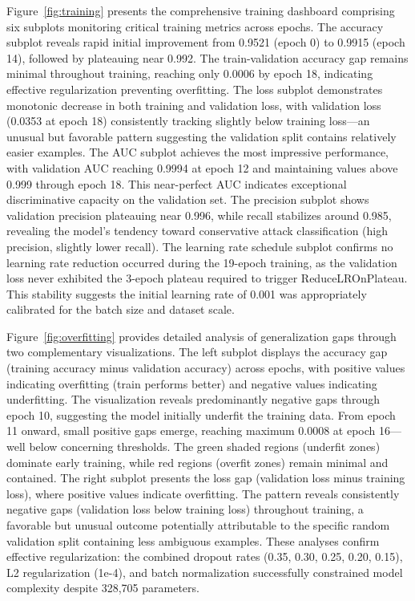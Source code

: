 \documentclass[12pt,a4paper]{report}
\begin{document}
Figure~\ref{fig:training} presents the comprehensive training dashboard comprising six subplots monitoring critical training metrics across epochs. The accuracy subplot reveals rapid initial improvement from 0.9521 (epoch 0) to 0.9915 (epoch 14), followed by plateauing near 0.992. The train-validation accuracy gap remains minimal throughout training, reaching only 0.0006 by epoch 18, indicating effective regularization preventing overfitting. The loss subplot demonstrates monotonic decrease in both training and validation loss, with validation loss (0.0353 at epoch 18) consistently tracking slightly below training loss---an unusual but favorable pattern suggesting the validation split contains relatively easier examples. The AUC subplot achieves the most impressive performance, with validation AUC reaching 0.9994 at epoch 12 and maintaining values above 0.999 through epoch 18. This near-perfect AUC indicates exceptional discriminative capacity on the validation set. The precision subplot shows validation precision plateauing near 0.996, while recall stabilizes around 0.985, revealing the model's tendency toward conservative attack classification (high precision, slightly lower recall). The learning rate schedule subplot confirms no learning rate reduction occurred during the 19-epoch training, as the validation loss never exhibited the 3-epoch plateau required to trigger ReduceLROnPlateau. This stability suggests the initial learning rate of 0.001 was appropriately calibrated for the batch size and dataset scale.

Figure~\ref{fig:overfitting} provides detailed analysis of generalization gaps through two complementary visualizations. The left subplot displays the accuracy gap (training accuracy minus validation accuracy) across epochs, with positive values indicating overfitting (train performs better) and negative values indicating underfitting. The visualization reveals predominantly negative gaps through epoch 10, suggesting the model initially underfit the training data. From epoch 11 onward, small positive gaps emerge, reaching maximum 0.0008 at epoch 16---well below concerning thresholds. The green shaded regions (underfit zones) dominate early training, while red regions (overfit zones) remain minimal and contained. The right subplot presents the loss gap (validation loss minus training loss), where positive values indicate overfitting. The pattern reveals consistently negative gaps (validation loss below training loss) throughout training, a favorable but unusual outcome potentially attributable to the specific random validation split containing less ambiguous examples. These analyses confirm effective regularization: the combined dropout rates (0.35, 0.30, 0.25, 0.20, 0.15), L2 regularization (1e-4), and batch normalization successfully constrained model complexity despite 328,705 parameters.
\end{document}
